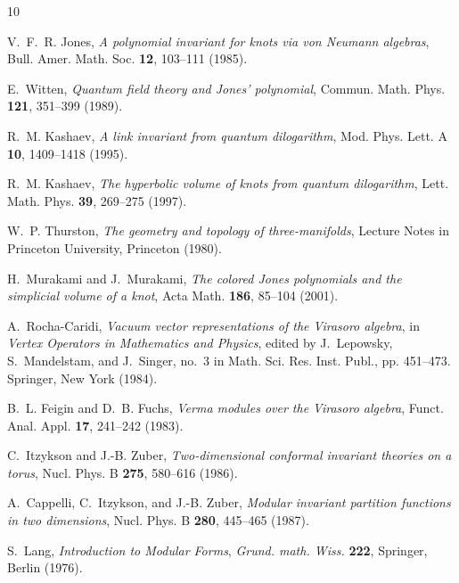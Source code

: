 \documentclass[12pt,reqno]{amsart}
\begin{document}
%

%
%
%
%
\begin{thebibliography}{10}

V.~F.~R. Jones, \emph{A polynomial invariant for knots via von {Neumann}
  algebras}, Bull. Amer. Math. Soc. \textbf{12}, 103--111 (1985).

E.~Witten, \emph{Quantum field theory and {Jones}' polynomial}, Commun. Math.
  Phys. \textbf{121}, 351--399 (1989).

R.~M. Kashaev, \emph{A link invariant from quantum dilogarithm}, Mod. Phys.
  Lett. A \textbf{10}, 1409--1418 (1995).

R.~M. Kashaev, \emph{The hyperbolic volume of knots from quantum dilogarithm},
  Lett. Math. Phys. \textbf{39}, 269--275 (1997).

W.~P. Thurston, \emph{The geometry and topology of three-manifolds}, Lecture
  Notes in Princeton University, Princeton (1980).

H.~Murakami and J.~Murakami, \emph{The colored {Jones} polynomials and the
  simplicial volume of a knot}, Acta Math. \textbf{186}, 85--104 (2001).

A.~Rocha-Caridi, \emph{Vacuum vector representations of the {Virasoro} algebra},
  in \emph{Vertex Operators in Mathematics and Physics}, edited by J.~Lepowsky,
  S.~Mandelstam, and J.~Singer, no.~3 in Math. Sci. Res. Inst. Publ., pp.
  451--473. Springer, New York (1984).

B.~L. Feigin and D.~B. Fuchs, \emph{Verma modules over the {Virasoro} algebra},
  Funct. Anal. Appl. \textbf{17}, 241--242 (1983).

C.~Itzykson and J.-B. Zuber, \emph{Two-dimensional conformal invariant theories
  on a torus}, Nucl. Phys. B \textbf{275}, 580--616 (1986).

A.~Cappelli, C.~Itzykson, and J.-B. Zuber, \emph{Modular invariant partition
  functions in two dimensions}, Nucl. Phys. B \textbf{280}, 445--465 (1987).

S.~Lang, \emph{Introduction to Modular Forms}, 
\emph{Grund. math.
  Wiss.} \textbf{222}, Springer, Berlin (1976).


\end{thebibliography}
\end{document}
